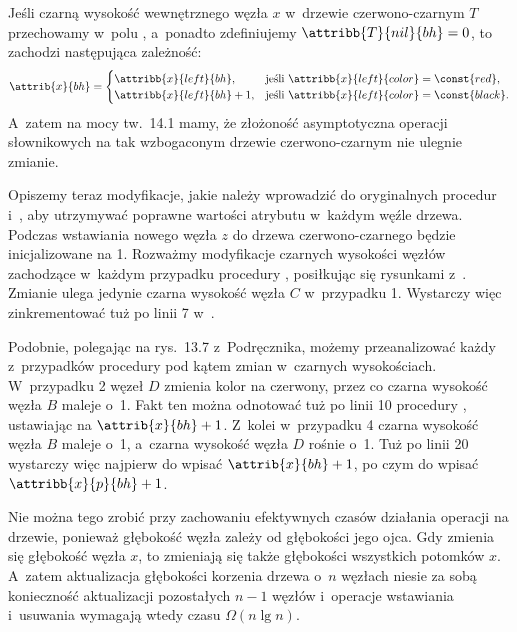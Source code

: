 \exercise %
Jeśli czarną wysokość wewnętrznego węzła $x$ w~drzewie czerwono-czarnym $T$ przechowamy w~polu , a~ponadto zdefiniujemy $\attribb{T}{nil}{bh}=0$, to zachodzi następująca zależność:
\[
	\attrib{x}{bh} = \begin{cases}
		\attribb{x}{left}{bh}, & \text{jeśli $\attribb{x}{left}{color}=\const{red}$}, \\
		\attribb{x}{left}{bh}+1, & \text{jeśli $\attribb{x}{left}{color}=\const{black}$}.
	\end{cases}
\]
A~zatem na mocy tw.\ 14.1 mamy, że złożoność asymptotyczna operacji słownikowych na tak wzbogaconym drzewie czerwono-czarnym nie ulegnie zmianie.

Opiszemy teraz modyfikacje, jakie należy wprowadzić do oryginalnych procedur  i~, aby utrzymywać poprawne wartości atrybutu  w~każdym węźle drzewa.
Podczas wstawiania nowego węzła $z$ do drzewa czerwono-czarnego  będzie inicjalizowane na 1.
Rozważmy modyfikacje czarnych wysokości węzłów zachodzące w~każdym przypadku procedury , posiłkując się rysunkami z~.
Zmianie ulega jedynie czarna wysokość węzła $C$ w~przypadku 1.
Wystarczy więc zinkrementować  tuż po linii 7 w~.

Podobnie, polegając na rys.\ 13.7 z~Podręcznika, możemy przeanalizować każdy z~przypadków procedury  pod kątem zmian w~czarnych wysokościach.
W~przypadku 2 węzeł $D$ zmienia kolor na czerwony, przez co czarna wysokość węzła $B$ maleje o~1.
Fakt ten można odnotować tuż po linii 10 procedury , ustawiając  na $\attrib{x}{bh}+1$.
Z~kolei w~przypadku 4 czarna wysokość węzła $B$ maleje o~1, a~czarna wysokość węzła $D$ rośnie o~1.
Tuż po linii 20 wystarczy więc najpierw do  wpisać $\attrib{x}{bh}+1$, po czym do  wpisać $\attribb{x}{p}{bh}+1$.

\exercise %
Nie można tego zrobić przy zachowaniu efektywnych czasów działania operacji na drzewie, ponieważ głębokość węzła zależy od głębokości jego ojca.
Gdy zmienia się głębokość węzła $x$, to zmieniają się także głębokości wszystkich potomków $x$.
A~zatem aktualizacja głębokości korzenia drzewa o~$n$ węzłach niesie za sobą konieczność aktualizacji pozostałych $n-1$ węzłów i~operacje wstawiania i~usuwania wymagają wtedy czasu $\Omega(n\lg n)$.

